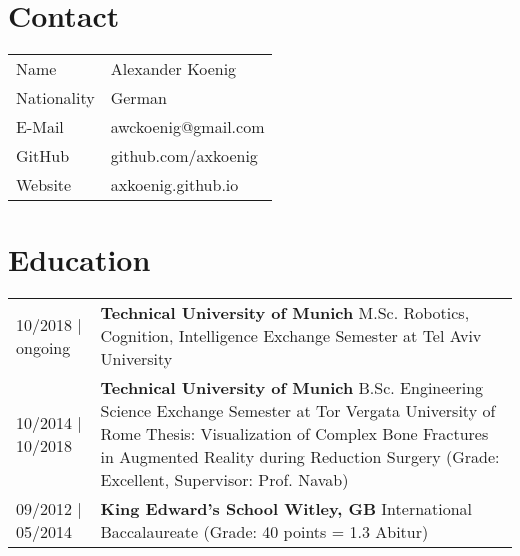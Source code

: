 \documentclass{article}
\begin{document}
\section*{Contact}
\begin{tabular}{@{}ll}
Name & Alexander Koenig \\
Nationality & German \\ 
E-Mail & awckoenig@gmail.com \\
GitHub & github.com/axkoenig \\
Website & axkoenig.github.io \\
\end{tabular}

\section*{Education}
\begin{tabularx}{\textwidth}{@{}lX}

10/2018 | ongoing &  \textbf{Technical University of Munich} \newline
                  	 M.Sc. Robotics, Cognition, Intelligence \newline 
                  	 Exchange Semester at Tel Aviv University \\
10/2014 | 10/2018 &  \textbf{Technical University of Munich} \newline
                  	 B.Sc. Engineering Science \newline 
                  	 Exchange Semester at Tor Vergata University of Rome \newline 
                  	 Thesis: Visualization of Complex Bone Fractures in Augmented Reality during Reduction Surgery (Grade: Excellent, Supervisor: Prof. Navab) \\
09/2012 | 05/2014 &  \textbf{King Edward's School Witley, GB} \newline
                  	 International Baccalaureate (Grade: 40 points = 1.3 Abitur) \\
\end{tabularx}

\end{document}

